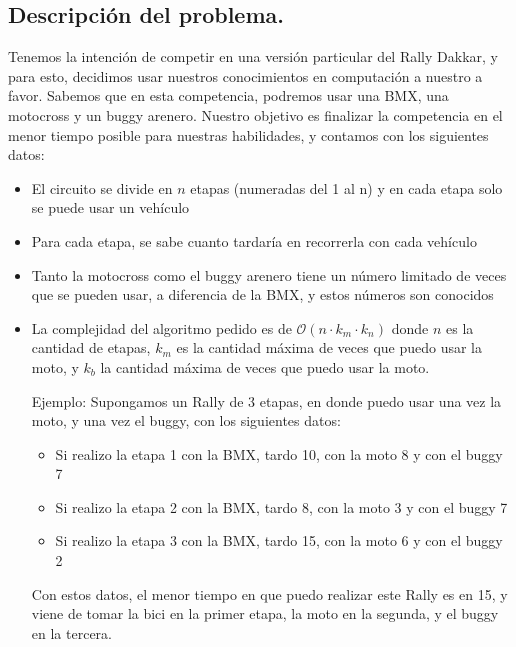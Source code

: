 \subsection{Descripción del problema.}

\vspace*{0.3cm}

Tenemos la intención de competir en una versión particular del Rally Dakkar, y para esto, decidimos usar nuestros conocimientos en computación a nuestro a favor. Sabemos que en esta competencia, podremos usar una BMX, una motocross y un buggy arenero. Nuestro objetivo es finalizar la competencia en el menor tiempo posible para nuestras habilidades, y contamos con los siguientes datos:

\begin{itemize}

	\item El circuito se divide en $n$ etapas (numeradas del 1 al n) y en cada etapa solo se puede usar un vehículo
	\item Para cada etapa, se sabe cuanto tardaría en recorrerla con cada vehículo
	\item Tanto la motocross como el buggy arenero tiene un número limitado de veces que se pueden usar, a diferencia de la BMX, y estos números son conocidos
	\item La complejidad del algoritmo pedido es de $\mathcal{O}(n \cdot k_{m} \cdot k_{n})$ donde $n$ es la cantidad de etapas, $k_{m}$ es la cantidad máxima de veces que puedo usar la moto, y $k_{b}$ la cantidad máxima de veces que puedo usar la moto.

Ejemplo:
Supongamos un Rally de 3 etapas, en donde puedo usar una vez la moto, y una vez el buggy, con los siguientes datos:
\begin{itemize}
	\item Si realizo la etapa 1 con la BMX, tardo 10, con la moto 8 y con el buggy 7
	\item Si realizo la etapa 2 con la BMX, tardo 8, con la moto 3 y con el buggy 7
	\item Si realizo la etapa 3 con la BMX, tardo 15, con la moto 6 y con el buggy 2

\end{itemize}

Con estos datos, el menor tiempo en que puedo realizar este Rally es en 15, y viene de tomar la bici en la primer etapa, la moto en la segunda, y el buggy en la tercera.

\end{itemize}

